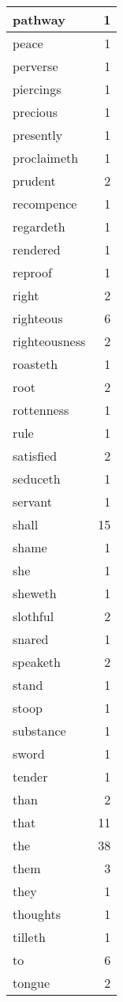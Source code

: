 \begin{center}
\begin{longtable}{l|r}
pathway & 1\\ \hline 
peace & 1\\ \hline 
perverse & 1\\ \hline 
piercings & 1\\ \hline 
precious & 1\\ \hline 
presently & 1\\ \hline 
proclaimeth & 1\\ \hline 
prudent & 2\\ \hline 
recompence & 1\\ \hline 
regardeth & 1\\ \hline 
rendered & 1\\ \hline 
reproof & 1\\ \hline 
right & 2\\ \hline 
righteous & 6\\ \hline 
righteousness & 2\\ \hline 
roasteth & 1\\ \hline 
root & 2\\ \hline 
rottenness & 1\\ \hline 
rule & 1\\ \hline 
satisfied & 2\\ \hline 
seduceth & 1\\ \hline 
servant & 1\\ \hline 
shall & 15\\ \hline 
shame & 1\\ \hline 
she & 1\\ \hline 
sheweth & 1\\ \hline 
slothful & 2\\ \hline 
snared & 1\\ \hline 
speaketh & 2\\ \hline 
stand & 1\\ \hline 
stoop & 1\\ \hline 
substance & 1\\ \hline 
sword & 1\\ \hline 
tender & 1\\ \hline 
than & 2\\ \hline 
that & 11\\ \hline 
the & 38\\ \hline 
them & 3\\ \hline 
they & 1\\ \hline 
thoughts & 1\\ \hline 
tilleth & 1\\ \hline 
to & 6\\ \hline 
tongue & 2\\ \hline 

\end{longtable}
\end{center}
